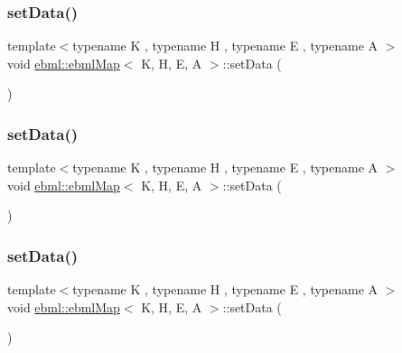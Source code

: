 \subsubsection{\texorpdfstring{set\+Data()}{setData()}\hspace{0.1cm}{\footnotesize\ttfamily [1/11]}}
{\footnotesize\ttfamily template$<$typename K , typename H , typename E , typename A $>$ \\
void \mbox{\hyperlink{classebml_1_1ebmlMap}{ebml\+::ebml\+Map}}$<$ K, H, E, A $>$\+::set\+Data (\begin{DoxyParamCaption}\item[{std\+::initializer\+\_\+list$<$ \mbox{\hyperlink{namespaceebml_adad533b7705a16bb360fe56380c5e7be}{ebml\+Element\+\_\+sp}} $>$}]{ }\end{DoxyParamCaption})}

\mbox{\label{classebml_1_1ebmlMap_a0e78920596118890009d9127f0a42c0e}} 
\subsubsection{\texorpdfstring{set\+Data()}{setData()}\hspace{0.1cm}{\footnotesize\ttfamily [2/11]}}
{\footnotesize\ttfamily template$<$typename K , typename H , typename E , typename A $>$ \\
void \mbox{\hyperlink{classebml_1_1ebmlMap}{ebml\+::ebml\+Map}}$<$ K, H, E, A $>$\+::set\+Data (\begin{DoxyParamCaption}{ }\end{DoxyParamCaption})}

\mbox{\label{classebml_1_1ebmlMap_ae05e1f77c6d1feed3bf2ff874caf1dba}} 
\subsubsection{\texorpdfstring{set\+Data()}{setData()}\hspace{0.1cm}{\footnotesize\ttfamily [3/11]}}
{\footnotesize\ttfamily template$<$typename K , typename H , typename E , typename A $>$ \\
void \mbox{\hyperlink{classebml_1_1ebmlMap}{ebml\+::ebml\+Map}}$<$ K, H, E, A $>$\+::set\+Data (\begin{DoxyParamCaption}{ }\end{DoxyParamCaption})}

